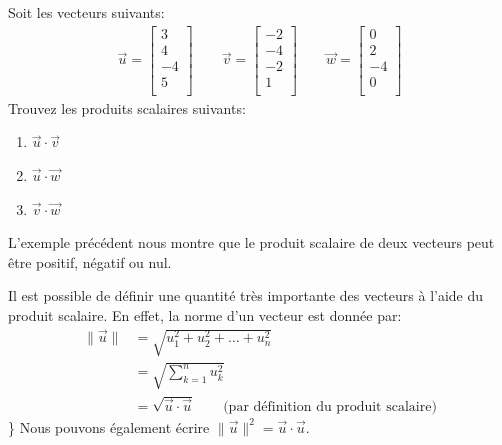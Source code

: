 \documentclass[]{book}
\providecommand{\tightlist}{%
  \setlength{\itemsep}{0pt}\setlength{\parskip}{0pt}}
\theoremstyle{definition}
\theoremstyle{definition}
\theoremstyle{definition}
\theoremstyle{remark}
\let\BeginKnitrBlock\begin \let\EndKnitrBlock\end
\begin{document}
\BeginKnitrBlock{example}
\protect\hypertarget{exm:unnamed-chunk-181}{}{\label{exm:unnamed-chunk-181} }Soit les vecteurs suivants:
\begin{align*}
\overrightarrow{u}=\begin{bmatrix}
3\\
4\\
-4\\
5\\
\end{bmatrix}
\qquad 
\overrightarrow{v}=\begin{bmatrix}
-2\\
-4\\
-2\\
1\\
\end{bmatrix}
\qquad 
\overrightarrow{w}=\begin{bmatrix}
0\\
2\\
-4\\
0\\
\end{bmatrix}
\end{align*}
Trouvez les produits scalaires suivants:

\begin{enumerate}
\def\labelenumi{\alph{enumi}.}
\tightlist
\item
  \(\overrightarrow{u}\cdot\overrightarrow{v}\)
\item
  \(\overrightarrow{u}\cdot\overrightarrow{w}\)
\item
  \(\overrightarrow{v}\cdot\overrightarrow{w}\)
\end{enumerate}
\EndKnitrBlock{example}

L'exemple précédent nous montre que le produit scalaire de deux vecteurs peut être positif, négatif ou nul.

Il est possible de définir une quantité très importante des vecteurs à l'aide du produit scalaire. En effet, la norme d'un vecteur est donnée par:
\begin{align*}
\lVert\overrightarrow{u}\rVert &= \sqrt{u_1^2+u_2^2+\ldots +u_n^2} \\
&= \sqrt{\sum_{k=1}^n u_k^2} \\
&= \sqrt{\overrightarrow{u} \cdot \overrightarrow{u}} \qquad \text{(par définition du produit scalaire)}
\end{align*}\}
Nous pouvons également écrire \(\lVert\overrightarrow{u}\rVert^2=\overrightarrow{u} \cdot \overrightarrow{u}\).
\end{document}
